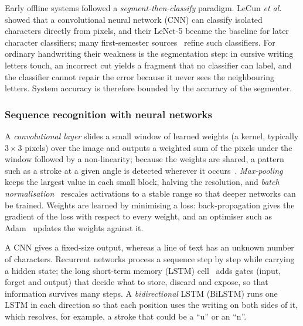 Early offline systems followed a \emph{segment-then-classify} paradigm. LeCun \emph{et al.}~\cite{lecun1998} showed that a convolutional neural network (CNN) can classify isolated characters directly from pixels, and their LeNet-5 became the baseline for later character classifiers; many first-semester sources~\cite{chen2023,ji2021,yahya2021,mamun2024} refine such classifiers. For ordinary handwriting their weakness is the segmentation step: in cursive writing letters touch, an incorrect cut yields a fragment that no classifier can label, and the classifier cannot repair the error because it never sees the neighbouring letters. System accuracy is therefore bounded by the accuracy of the segmenter.

\subsubsection{Sequence recognition with neural networks}
\label{sec:lit-nn}

A \emph{convolutional layer} slides a small window of learned weights (a kernel, typically $3\times3$ pixels) over the image and outputs a weighted sum of the pixels under the window followed by a non-linearity; because the weights are shared, a pattern such as a stroke at a given angle is detected wherever it occurs~\cite{lecun1998}. \emph{Max-pooling} keeps the largest value in each small block, halving the resolution, and \emph{batch normalisation}~\cite{ioffe2015} rescales activations to a stable range so that deeper networks can be trained. Weights are learned by minimising a loss: back-propagation gives the gradient of the loss with respect to every weight, and an optimiser such as Adam~\cite{kingma2015} updates the weights against it.

A CNN gives a fixed-size output, whereas a line of text has an unknown number of characters. Recurrent networks process a sequence step by step while carrying a hidden state; the long short-term memory (LSTM) cell~\cite{hochreiter1997} adds gates (input, forget and output) that decide what to store, discard and expose, so that information survives many steps. A \emph{bidirectional} LSTM (BiLSTM) runs one LSTM in each direction so that each position uses the writing on both sides of it, which resolves, for example, a stroke that could be a ``u'' or an ``n''.

